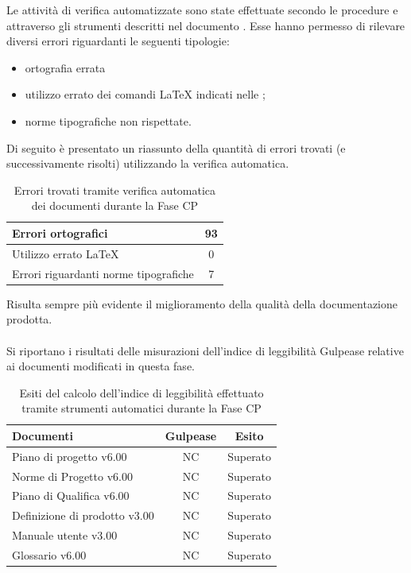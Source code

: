 Le attività di verifica automatizzate sono state effettuate secondo le procedure e attraverso gli strumenti descritti nel documento . Esse hanno permesso di rilevare diversi errori riguardanti le seguenti tipologie:
\begin{itemize}
\item ortografia errata
\item utilizzo errato dei comandi \LaTeX{} indicati nelle ;
\item norme tipografiche non rispettate.
\end{itemize}
Di seguito è presentato un riassunto della quantità di errori trovati (e successivamente risolti) utilizzando la verifica automatica.
\begin{table}[H]
	\centering
		\begin{tabu}{| l | c |}
			\hline
			Errori ortografici	& 93	\\ \hline
			Utilizzo errato \LaTeX{}	& 0	\\ \hline
			Errori riguardanti norme tipografiche	& 7	\\ \hline
		\end{tabu}
	\caption{Errori trovati tramite verifica automatica dei documenti durante la Fase CP}
\end{table}

Risulta sempre più evidente il miglioramento della qualità della documentazione prodotta.\\ \\
Si riportano i risultati delle misurazioni dell'indice di leggibilità Gulpease relative ai documenti modificati in questa fase.


\begin{table}[H]
	\centering
		\begin{tabu}{| l | c | c |}
			\hline
			Documenti 							& Gulpease	& Esito		\\ \hline \hline
			Piano di progetto v6.00				& NC 		& Superato  \\ \hline
			Norme di Progetto v6.00 			& NC		& Superato  \\ \hline
			Piano di Qualifica v6.00 			& NC		& Superato  \\ \hline
			Definizione di prodotto v3.00		& NC		& Superato \\ \hline
			Manuale utente v3.00				& NC		& Superato \\ \hline
			Glossario v6.00					 	& NC 		& Superato  \\ \hline
		\end{tabu}
	\caption{Esiti del calcolo dell'indice di leggibilità effettuato tramite strumenti automatici durante la Fase CP}
\end{table}

